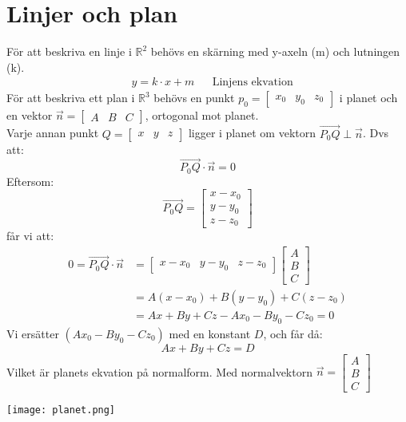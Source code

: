 \section{Linjer och plan} %
\label{sec:linjer_och_plan}
För att beskriva en linje i $\mathbb{R}^2$ behövs en skärning med y-axeln (m) och lutningen (k).
\begin{align}
    &y = k \cdot x + m &&\mbox{Linjens ekvation}
\end{align}
För att beskriva ett plan i $\mathbb{R}^3$ behövs en punkt $p_0 = \begin{bmatrix} x_0&y_0&z_0 \end{bmatrix}$ i planet och en vektor $\vec{n} = \begin{bmatrix} A &B &C \end{bmatrix}$, ortogonal mot planet.\\
Varje annan punkt $Q = \begin{bmatrix} x &y &z \end{bmatrix}$ ligger i planet om vektorn $\overrightarrow{P_0Q} \perp \vec{n}$. Dvs att:
\[
    \overrightarrow{P_0Q} \cdot \vec{n} = 0
\]
Eftersom:
\[
    \overrightarrow{P_0Q} = \begin{bmatrix} x-x_0\\y-y_0\\z-z_0 \end{bmatrix}
\]
får vi att:
\begin{align*}
0 = \overrightarrow{P_0Q} \cdot \vec{n} &= \begin{bmatrix} x-x_0 &y-y_0 &z-z_0 \end{bmatrix} \begin{bmatrix} A\\B\\C \end{bmatrix} \\&= A(x-x_0) + B(y-y_0) + C(z-z_0) \\&= Ax + By + Cz - Ax_0 - By_0 - Cz_0 = 0
\end{align*}
Vi ersätter $(Ax_0 - By_0 - Cz_0)$ med en konstant $D$, och får då:
\[
    Ax + By + Cz = D
\]
Vilket är planets ekvation på normalform. Med normalvektorn $\vec{n} = \begin{bmatrix} A\\B\\C \end{bmatrix}$
\begin{center}
    \texttt{[image: planet.png]}
\end{center}
\newpage

